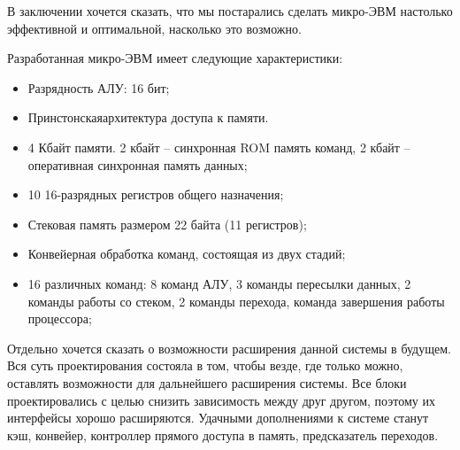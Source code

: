

	В заключении хочется сказать, что мы постарались сделать микро-ЭВМ настолько эффективной и оптимальной, насколько это возможно.

	Разработанная микро-ЭВМ имеет следующие характеристики:
    \begin{itemize}
        \item Разрядность АЛУ: 16 бит;
        \item Принстонскаяархитектура доступа к памяти.
        \item 4 Кбайт памяти. 2 кбайт – синхронная ROM память команд, 2 кбайт – оперативная синхронная память данных;
        \item 10 16-разрядных регистров общего назначения;
        \item Стековая память размером 22 байта (11 регистров);
        \item Конвейерная обработка команд, состоящая из двух стадий;
        \item 16 различных команд: 8 команд АЛУ, 3 команды пересылки данных, 2 команды работы со стеком, 2 команды перехода, команда завершения работы процессора;
    \end{itemize}

	Отдельно хочется сказать о возможности расширения данной системы в будущем. Вся суть проектирования состояла в том, чтобы везде, где только можно, оставлять возможности для дальнейшего расширения системы. Все блоки проектировались с целью снизить зависимость между друг другом, поэтому их интерфейсы хорошо расширяются. Удачными дополнениями к системе станут кэш, конвейер, контроллер прямого доступа в память, предсказатель переходов.

\clearpage
